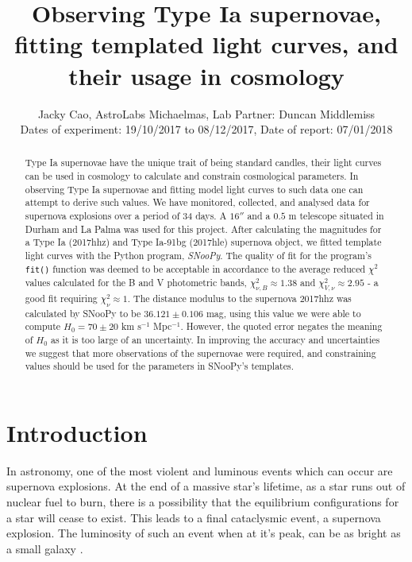 \documentclass[twocolumn]{revtex4}
\begin{document}
\textheight=26.385cm

\title{Observing Type Ia supernovae, fitting templated light curves, and their usage in cosmology}
 
\author{Jacky Cao, AstroLabs Michaelmas, Lab Partner: Duncan Middlemiss \\ Dates of experiment: 19/10/2017 to 08/12/2017, Date of report: 07/01/2018}

\begin{abstract}              
Type Ia supernovae have the unique trait of being standard candles, their light curves can be used in cosmology to calculate and constrain cosmological parameters. In observing Type Ia supernovae and fitting model light curves to such data one can attempt to derive such values. We have monitored, collected, and analysed data for supernova explosions over a period of 34 days. A $16''$ and a $0.5$ m telescope situated in Durham and La Palma was used for this project. After calculating the magnitudes for a Type Ia (2017hhz) and Type Ia-91bg (2017hle) supernova object, we fitted template light curves with the Python program, \textit{SNooPy}. The quality of fit for the program's \texttt{fit()} function was deemed to be acceptable in accordance to the average reduced $\chi^2$ values calculated for the B and V photometric bands, $\chi^2_{\nu,B} \approx 1.38$ and $\chi^2_{V,\nu} \approx 2.95$ - a good fit requiring $\chi^2_{\nu} \approx1$. The distance modulus to the supernova 2017hhz was calculated by SNooPy to be $36.121\pm0.106$ mag, using this value we were able to compute $H_0=70\pm20$ km s$^{-1}$ Mpc$^{-1}$. However, the quoted error negates the meaning of $H_0$ as it is too large of an uncertainty. In improving the accuracy and uncertainties we suggest that more observations of the supernovae were required, and constraining values should be used for the parameters in SNooPy's templates.
\end{abstract}

\maketitle

\vspace{-3ex}
\section{Introduction} 
\label{intro}
\vspace{-2ex}
In astronomy, one of the most violent and luminous events which can occur are supernova explosions. At the end of a massive star's lifetime, as a star runs out of nuclear fuel to burn, there is a possibility that the equilibrium configurations for a star will cease to exist. This leads to a final cataclysmic event, a supernova explosion. The luminosity of such an event when at it's peak, can be as bright as a small galaxy \cite{longair}.
\end{document}
